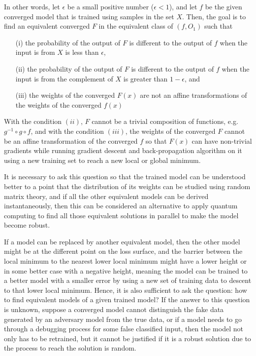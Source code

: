 \documentclass{article}
\theoremstyle{plain}
\theoremstyle{plain} %
\theoremstyle{definition}  %
\theoremstyle{remark}  %
\theoremstyle{plain}
\begin{document}
In other words, let $\epsilon$ be a small positive number ($\epsilon< 1$), and let $f$ be the given converged model that is trained using samples in the set $X$. Then, the goal is to find an equivalent converged $F$ in the equivalent class of $(f,O_1)$ such that
\begin{itemize}
\item[(i)] the probability of the output of $F$ is different to the output of $f$ when the input is from $X$ is less than $\epsilon$,
\item[(ii)] the probability of the output of $F$ is different to the output of $f$ when the input is from the complement of $X$ is greater than $1-\epsilon$, and
\item[(iii)] the weights of the converged $F(x)$ are not an affine transformations of the weights of the converged $f(x)$
\end{itemize}

With the condition $(ii)$, $F$ cannot be a trivial composition of functions, e.g. $g^{-1}\circ g\circ f$, and with the condition $(iii)$, the weights of the converged $F$ cannot be an affine transformation of the converged $f$ so that $F(x)$ can have non-trivial gradients while running gradient descent and back-propagation algorithm on it using a new training set to reach a new local or global minimum.

It is necessary to ask this question so that the trained model can be understood better to a point that the distribution of its weights can be studied using random matrix theory, and if all the other equivalent models can be derived instantaneously, then this can be considered an alternative to apply quantum computing to find all those equivalent solutions in parallel to make the model become robust.

If a model can be replaced by another equivalent model, then the other model might be at the different point on the loss surface\cite{li2018visualizing,garipov2018loss, malan2021survey, draxler2018essentially, freeman2016topology, du2019gradient}, and the barrier between the local minimum to the nearest lower local minimum might have a lower height or in some better case with a negative height, meaning the model can be trained to a better model with a smaller error by using a new set of training data to descent to that lower local minimum. Hence, it is also sufficient to ask the question: how to find equivalent models of a given trained model? If the answer to this question is unknown, suppose a converged model cannot distinguish the fake data generated by an adversary model from the true data, or if a model needs to go through a debugging process for some false classified input, then the model not only has to be retrained, but it cannot be justified if it is a robust solution due to the process to reach the solution is random.
\end{document}
